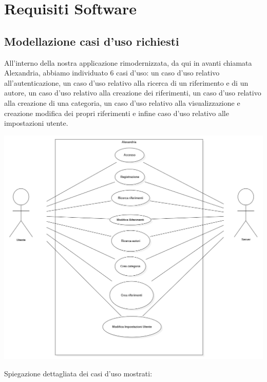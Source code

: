 \chapter{Requisiti Software}
\raggedright{\section{Modellazione casi d'uso richiesti}}
All'interno della nostra applicazione rimodernizzata, da qui in avanti chiamata \gls{Alexandria}, abbiamo individuato 6 \gls{casi d'uso}: un caso d'uso relativo all'autenticazione, un caso d'uso relativo alla ricerca di un \gls{riferimento} e di un \gls{autore}, un caso d'uso relativo alla creazione dei riferimenti, un caso d'uso relativo alla creazione di una \gls{categoria}, un caso d'uso relativo alla visualizzazione e creazione modifica dei propri riferimenti e infine caso d'uso relativo alle impostazioni utente.
         \begin{center}
     \hspace{-1cm}
            \includegraphics[width=.90\textwidth]{Immagini/Alexandria/useCase.png} 
        \end{center}
\newpage
Spiegazione dettagliata dei casi d'uso mostrati: 
